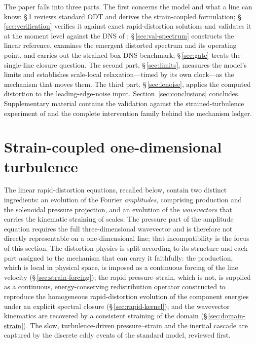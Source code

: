 \documentclass[11pt,a4paper]{article}
\begin{document}
The paper falls into three parts. The first concerns the model and what a
line can know: \S\,\ref{sec:formulation} reviews standard ODT and derives
the strain-coupled formulation; \S\,\ref{sec:verification} verifies it
against exact rapid-distortion solutions and validates it at the moment
level against the DNS of \citet{LeeReynolds1985}; \S\,\ref{sec:val-spectrum}
constructs the linear reference, examines the emergent distorted spectrum
and its operating point, and carries out the strained-box DNS benchmark;
\S\,\ref{sec:gate} treats the single-line closure question. The second
part, \S\,\ref{sec:limits}, measures the model's limits and establishes
scale-local relaxation---timed by its own clock---as the mechanism that
moves them. The third part, \S\,\ref{sec:lenoise}, applies the computed
distortion to the leading-edge-noise input.
Section~\ref{sec:conclusions} concludes. Supplementary material contains
the validation against the strained-turbulence experiment of
\citet{ChenMeneveauKatz2006} and the complete intervention family behind
the mechanism ledger.

\section{Strain-coupled one-dimensional turbulence}\label{sec:formulation}

The linear rapid-distortion equations, recalled below, contain two
distinct ingredients: an evolution of the Fourier \emph{amplitudes},
comprising production and the solenoidal pressure projection, and an
evolution of the \emph{wavevectors} that carries the kinematic straining
of scales. The pressure part of the amplitude equation requires the full
three-dimensional wavevector and is therefore not directly representable
on a one-dimensional line; that incompatibility is the focus of this section.
The distortion physics is split according to its structure and each part
assigned to the mechanism that can carry it faithfully: the production,
which is local in physical space, is imposed as a continuous forcing of
the line velocity (\S\,\ref{sec:strain-forcing}); the rapid
pressure--strain, which is not, is supplied as a continuous,
energy-conserving redistribution operator constructed to reproduce the
homogeneous rapid-distortion evolution of the component energies under an
explicit spectral closure (\S\,\ref{sec:rapid-kernel}); and the wavevector
kinematics are recovered by a consistent straining of the domain
(\S\,\ref{sec:domain-strain}). The slow, turbulence-driven pressure--strain and the inertial cascade
are captured by the discrete eddy events of the standard model, reviewed first.
\end{document}
